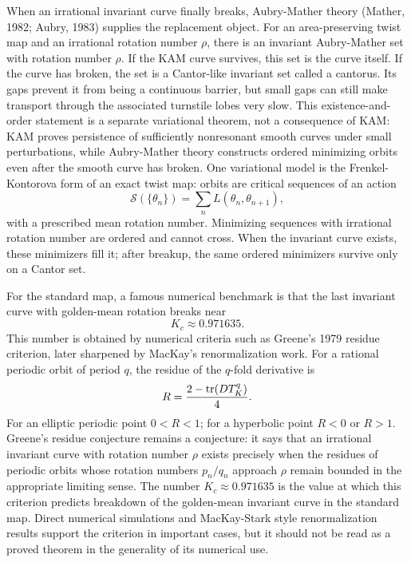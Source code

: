 When an irrational invariant curve finally breaks, Aubry-Mather theory
(Mather, 1982; Aubry, 1983) supplies the replacement object. For an
area-preserving twist map and an irrational
rotation number \(\rho\), there is an invariant Aubry-Mather set with rotation
number \(\rho\). If the KAM curve survives, this set is the curve itself. If
the curve has broken, the set is a Cantor-like invariant set called a
cantorus. Its gaps prevent it from being a continuous barrier, but small gaps
can still make transport through the associated turnstile lobes very slow.
This existence-and-order statement is a separate variational theorem, not a
consequence of KAM: KAM proves persistence of sufficiently nonresonant smooth
curves under small perturbations, while Aubry-Mather theory constructs ordered
minimizing orbits even after the smooth curve has broken.
One variational model is the Frenkel-Kontorova form of an exact twist map:
orbits are critical sequences of an action
\[
  \mathcal S(\{\theta_n\})=\sum_n L(\theta_n,\theta_{n+1}),
\]
with a prescribed mean rotation number. Minimizing sequences with irrational
rotation number are ordered and cannot cross. When the invariant curve exists,
these minimizers fill it; after breakup, the same ordered minimizers survive
only on a Cantor set.

For the standard map, a famous numerical benchmark is that the last invariant
curve with golden-mean rotation breaks near
\[
  K_c\approx0.971635.
\]
This number is obtained by numerical criteria such as Greene's 1979 residue
criterion, later sharpened by MacKay's renormalization work. For a rational
periodic orbit of period \(q\), the residue of the
\(q\)-fold derivative is
\[
  R=\frac{2-\operatorname{tr}(DT_K^q)}{4}.
\]
For an elliptic periodic point \(0<R<1\); for a hyperbolic point \(R<0\) or
\(R>1\). Greene's residue conjecture remains a conjecture: it says that an
irrational invariant curve
with rotation number \(\rho\) exists precisely when the residues of periodic
orbits whose rotation numbers \(p_n/q_n\) approach \(\rho\) remain bounded in
the appropriate limiting sense. The number \(K_c\approx0.971635\) is the value
at which this criterion predicts breakdown of the golden-mean invariant curve
in the standard map. Direct numerical simulations and MacKay-Stark style
renormalization results support the criterion in important cases, but it should
not be read as a proved theorem in the generality of its numerical use.

